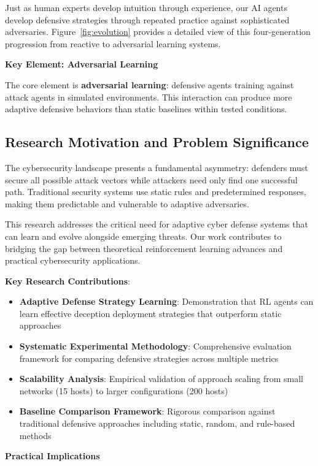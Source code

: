 \documentclass[12pt,oneside]{article}
\begin{document}
Just as human experts develop intuition through experience, our AI agents develop defensive strategies through repeated practice against sophisticated adversaries. Figure~\ref{fig:evolution} provides a detailed view of this four-generation progression from reactive to adversarial learning systems.

\textbf{Key Element: Adversarial Learning}

The core element is \textbf{adversarial learning}: defensive agents training against attack agents in simulated environments. This interaction can produce more adaptive defensive behaviors than static baselines within tested conditions.

\subsection{Research Motivation and Problem Significance}

The cybersecurity landscape presents a fundamental asymmetry: defenders must secure all possible attack vectors while attackers need only find one successful path. Traditional security systems use static rules and predetermined responses, making them predictable and vulnerable to adaptive adversaries.

This research addresses the critical need for adaptive cyber defense systems that can learn and evolve alongside emerging threats. Our work contributes to bridging the gap between theoretical reinforcement learning advances and practical cybersecurity applications.

\textbf{Key Research Contributions}:
\begin{itemize}
    \item \textbf{Adaptive Defense Strategy Learning}: Demonstration that RL agents can learn effective deception deployment strategies that outperform static approaches
    \item \textbf{Systematic Experimental Methodology}: Comprehensive evaluation framework for comparing defensive strategies across multiple metrics
    \item \textbf{Scalability Analysis}: Empirical validation of approach scaling from small networks (15 hosts) to larger configurations (200 hosts)
    \item \textbf{Baseline Comparison Framework}: Rigorous comparison against traditional defensive approaches including static, random, and rule-based methods
\end{itemize}

\textbf{Practical Implications}
\end{document}
